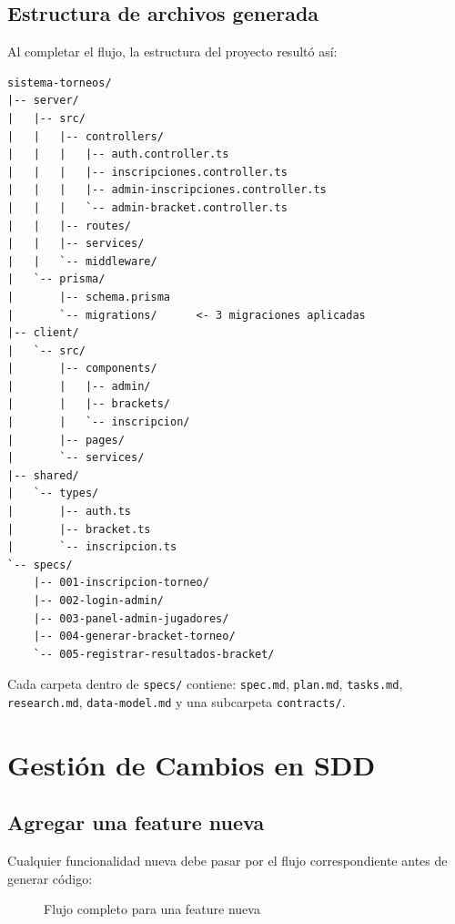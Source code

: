 \documentclass[12pt, a4paper]{report}
\begin{document}
\section{Estructura de archivos generada}

Al completar el flujo, la estructura del proyecto result\'o as\'i:

\begin{lstlisting}
sistema-torneos/
|-- server/
|   |-- src/
|   |   |-- controllers/
|   |   |   |-- auth.controller.ts
|   |   |   |-- inscripciones.controller.ts
|   |   |   |-- admin-inscripciones.controller.ts
|   |   |   `-- admin-bracket.controller.ts
|   |   |-- routes/
|   |   |-- services/
|   |   `-- middleware/
|   `-- prisma/
|       |-- schema.prisma
|       `-- migrations/      <- 3 migraciones aplicadas
|-- client/
|   `-- src/
|       |-- components/
|       |   |-- admin/
|       |   |-- brackets/
|       |   `-- inscripcion/
|       |-- pages/
|       `-- services/
|-- shared/
|   `-- types/
|       |-- auth.ts
|       |-- bracket.ts
|       `-- inscripcion.ts
`-- specs/
    |-- 001-inscripcion-torneo/
    |-- 002-login-admin/
    |-- 003-panel-admin-jugadores/
    |-- 004-generar-bracket-torneo/
    `-- 005-registrar-resultados-bracket/
\end{lstlisting}

Cada carpeta dentro de \texttt{specs/} contiene: \texttt{spec.md},
\texttt{plan.md}, \texttt{tasks.md}, \texttt{research.md},
\texttt{data-model.md} y una subcarpeta \texttt{contracts/}.

\chapter{Gesti\'on de Cambios en SDD}

\section{Agregar una feature nueva}

Cualquier funcionalidad nueva debe pasar por el flujo correspondiente
antes de generar c\'odigo:

\begin{figure}[H]
\centering
{}
\caption{Flujo completo para una feature nueva}
\end{figure}
\end{document}
